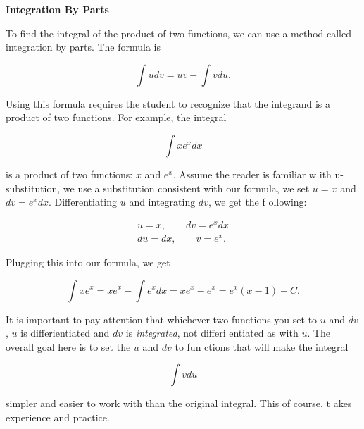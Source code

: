 \documentclass{article}
\begin{document}
    
 \textbf{Integration By Parts}
  
 To find the integral of the product of two functions, we can use a method
 called integration by parts. The formula is
  
 \[
   \int udv = uv - \int vdu.
 \]
  
 Using this formula requires the student to recognize that the integrand is a     product of two functions. For example, the integral
  
 \[
   \int xe^xdx
 \]
   
 is a product of two functions: $x$ and $e^x$. Assume the reader is familiar w    ith u-substitution, we use a substitution consistent with our formula, we set     $u=x$ and $dv=e^xdx$. Differentiating $u$ and integrating $dv$, we get the f    ollowing:
   
 \begin{align*}
 u=x, \qquad dv=e^xdx\\
 du=dx, \qquad v=e^x.
 \end{align*}
   
 Plugging this into our formula, we get
   
 \[
   \int xe^x = xe^x - \int e^xdx = xe^x - e^x = e^x(x-1) + C.
 \]
   
 It is important to pay attention that whichever two functions you set to $u$     and $dv$, $u$ is differientiated and $dv$ is \textit{integrated}, not differi    entiated as with $u$. The overall goal here is to set the $u$ and $dv$ to fun    ctions that will make the integral
   
 \[
   \int vdu
 \]
   
 simpler and easier to work with than the original integral. This of course, t    akes experience and practice.
  
 
\end{document}
